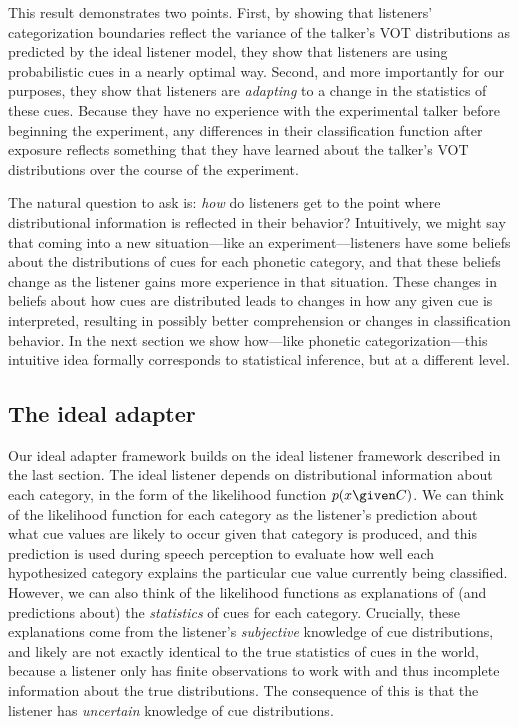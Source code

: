 This result demonstrates two points.  First, by showing that listeners' categorization boundaries reflect the variance of the talker's VOT distributions as predicted by the ideal listener model, they show that listeners are using probabilistic cues in a nearly optimal way.  Second, and more importantly for our purposes, they show that listeners are \emph{adapting} to a change in the statistics of these cues.  Because they have no experience with the experimental talker before beginning the experiment, any differences in their classification function after exposure reflects something that they have learned about the talker's VOT distributions over the course of the experiment.

The natural question to ask is: \emph{how} do listeners get to the point where distributional information is reflected in their behavior?  Intuitively, we might say that coming into a new situation---like an experiment---listeners have some beliefs about the distributions of cues for each phonetic category, and that these beliefs change as the listener gains more experience in that situation.  These changes in beliefs about how cues are distributed leads to changes in how any given cue is interpreted, resulting in possibly better comprehension or changes in classification behavior.  In the next section we show how---like phonetic categorization---this intuitive idea formally corresponds to statistical inference, but at a different level.

\subsection{The ideal adapter}
\label{sec:ideal-adapter}

Our ideal adapter framework builds on the ideal listener framework described in the last section.  The ideal listener depends on distributional information about each category, in the form of the likelihood function $p(x \given C)$.
We can think of the likelihood function for each category as the listener's prediction about what cue values are likely to occur given that category is produced, and this prediction is used during speech perception to evaluate how well each hypothesized category explains the particular cue value currently being classified.  However, we can also think of the likelihood functions as explanations of (and predictions about) the \emph{statistics} of cues for each category.  Crucially, these explanations come from the listener's \emph{subjective} knowledge of cue distributions, and likely are not exactly identical to the true statistics of cues in the world, because a listener only has finite observations to work with and thus incomplete information about the true distributions.  The consequence of this is that the listener has \emph{uncertain} knowledge of cue distributions.

